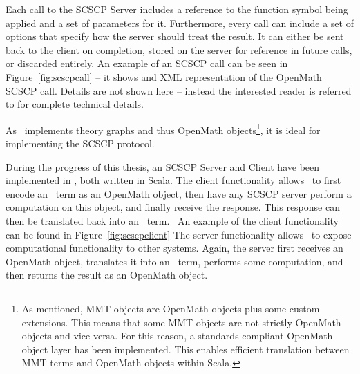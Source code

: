 
Each call to the SCSCP Server includes a reference to the function symbol being applied and a set of parameters for it. 
Furthermore, every call can include a set of options that specify how the server should treat the result. 
It can either be sent back to the client on completion, stored on the server for reference in future calls, or discarded entirely. 
An example of an SCSCP call can be seen in Figure~\ref{fig:scscpcall} -- it shows and XML representation of the OpenMath SCSCP call. 
Details are not shown here -- instead the interested reader is referred to \cite{ODK-D3.3} for complete technical details.  


As \mmt\ implements theory graphs and thus OpenMath objects\footnote{
  As mentioned, MMT objects are OpenMath objects plus some custom extensions. 
  This means that some MMT objects are not strictly OpenMath objects and vice-versa. 
  For this reason, a standards-compliant OpenMath object layer has been implemented. 
  This enables efficient translation between MMT terms and OpenMath objects within Scala. 
}, it is ideal for implementing the SCSCP protocol. 

During the progress of this thesis, an SCSCP Server and Client have been implemented in \mmt, both written in Scala. 
The client functionality allows \mmt\ to first encode an \mmt\ term as an OpenMath object, then have any SCSCP server perform a computation on this object, and finally receive the response. 
This response can then be translated back into an \mmt\ term. \
An example of the client functionality can be found in Figure~\ref{fig:scscpclient}
The server functionality allows \mmt\ to expose computational functionality to other systems.
Again, the server first receives an OpenMath object, translates it into an \mmt\ term, performs some computation, and then returns the result as an OpenMath object. 